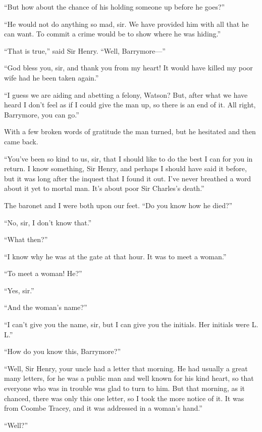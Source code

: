 \documentclass[paper=5.5in:8.5in,BCOR=7mm,twoside,DIV=calc,12pt,usegeometry,openany,chapterprefix,endperiod,headings=big]{scrbook} %
\begin{document}
\enquote{But how about the chance of his holding someone up before he goes?}

\enquote{He would not do anything so mad, sir. We have provided him with all that he can want. To commit a crime would be to show where he was hiding.}

\enquote{That is true,} said Sir Henry. \enquote{Well, Barrymore---}

\enquote{God bless you, sir, and thank you from my heart! It would have killed my poor wife had he been taken again.}

\enquote{I guess we are aiding and abetting a felony, Watson? But, after what we have heard I don't feel as if I could give the man up, so there is an end of it. All right, Barrymore, you can go.}

With a few broken words of gratitude the man turned, but he hesitated and then came back.

\enquote{You've been so kind to us, sir, that I should like to do the best I can for you in return. I know something, Sir Henry, and perhaps I should have said it before, but it was long after the inquest that I found it out. I've never breathed a word about it yet to mortal man. It's about poor Sir Charles's death.}

The baronet and I were both upon our feet. \enquote{Do you know how he died?}

\enquote{No, sir, I don't know that.}

\enquote{What then?}

\enquote{I know why he was at the gate at that hour. It was to meet a woman.}

\enquote{To meet a woman! He?}

\enquote{Yes, sir.}

\enquote{And the woman's name?}

\enquote{I can't give you the name, sir, but I can give you the initials. Her initials were L. L.}

\enquote{How do you know this, Barrymore?}

\enquote{Well, Sir Henry, your uncle had a letter that morning. He had usually a great many letters, for he was a public man and well known for his kind heart, so that everyone who was in trouble was glad to turn to him. But that morning, as it chanced, there was only this one letter, so I took the more notice of it. It was from Coombe Tracey, and it was addressed in a woman's hand.}

\enquote{Well?}
\end{document}
